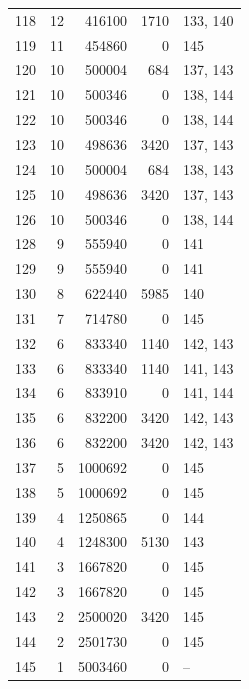 \documentclass[10pt,a4paper]{article}
\begin{document}
\begin{longtable}{r r r r p{57mm}}
118&12&416100&1710&133, 140\\
119&11&454860&0&145\\
120&10&500004&684&137, 143\\
121&10&500346&0&138, 144\\
122&10&500346&0&138, 144\\
123&10&498636&3420&137, 143\\
124&10&500004&684&138, 143\\
125&10&498636&3420&137, 143\\
126&10&500346&0&138, 144\\
128&9&555940&0&141\\
129&9&555940&0&141\\
130&8&622440&5985&140\\
131&7&714780&0&145\\
132&6&833340&1140&142, 143\\
133&6&833340&1140&141, 143\\
134&6&833910&0&141, 144\\
135&6&832200&3420&142, 143\\
136&6&832200&3420&142, 143\\
137&5&1000692&0&145\\
138&5&1000692&0&145\\
139&4&1250865&0&144\\
140&4&1248300&5130&143\\
141&3&1667820&0&145\\
142&3&1667820&0&145\\
143&2&2500020&3420&145\\
144&2&2501730&0&145\\
145&1&5003460&0&--\\
\bottomrule\end{longtable}
\end{document}
